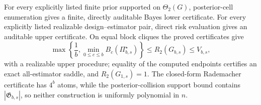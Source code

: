 For every explicitly listed finite prior supported on \(\Theta_2(G)\), posterior-cell enumeration gives a finite, directly auditable Bayes lower certificate. For every explicitly listed realizable design--estimator pair, direct risk evaluation gives an auditable upper certificate. On equal block cliques the proved certificates give
\[
\max\left\{\frac1b,\min_{0\leq c\leq b}B_c(\Pi_{b,s}^{\star})\right\}
\leq R_2(G_{b,s})\leq V_{b,s},
\]
with a realizable upper procedure; equality of the computed endpoints certifies an exact all-estimator saddle, and \(R_2(G_{1,s})=1\). The closed-form Rademacher certificate has \(4^b\) atoms, while the posterior-collision support bound contains \(|\mathfrak G_{b,s}|\), so neither construction is uniformly polynomial in \(n\).